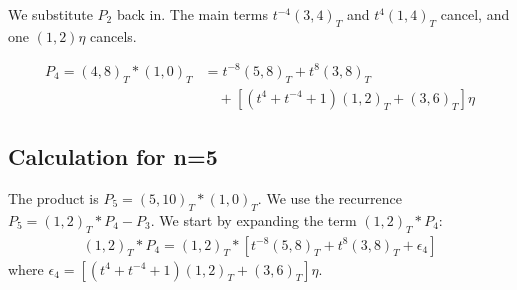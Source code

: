 \documentclass[12pt]{article}
\begin{document}
We substitute $P_2$ back in. The main terms $t^{-4}(3,4)_T$ and $t^{4}(1,4)_T$ cancel, and one $(1,2)\eta$ cancels.

\begin{align}
P_4 = (4,8)_T \ast (1,0)_T &= t^{-8}(5,8)_T + t^{8}(3,8)_T \\
&\quad + [ (t^4 + t^{-4} + 1)(1,2)_T + (3,6)_T ]\eta
\end{align}

\subsection*{Calculation for n=5}
The product is $P_5 = (5,10)_T \ast (1,0)_T$. We use the recurrence $P_5 = (1,2)_T \ast P_4 - P_3$. We start by expanding the term $(1,2)_T \ast P_4$:
\begin{align*}
(1,2)_T \ast P_4 = (1,2)_T \ast \left[ t^{-8}(5,8)_T + t^{8}(3,8)_T + \epsilon_4 \right]
\end{align*}
where $\epsilon_4 = [ (t^4 + t^{-4} + 1)(1,2)_T + (3,6)_T ]\eta$.
\end{document}
